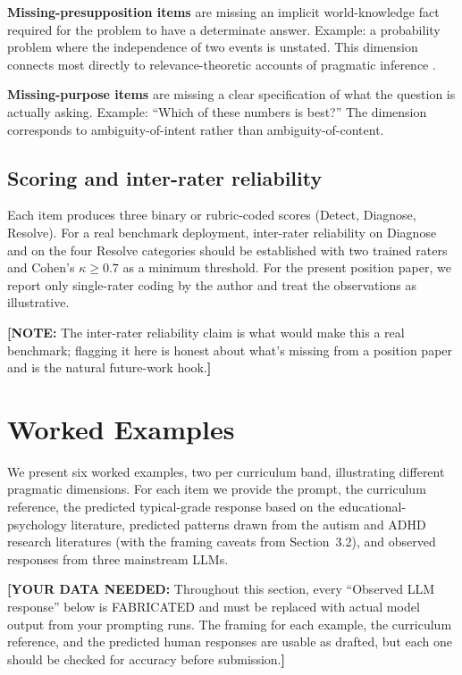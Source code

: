 \documentclass[11pt,letterpaper]{article}
\newcommand{\dataneeded}[1]{{\color{blue}\textbf{[YOUR DATA NEEDED:} #1\textbf{]}}}
\newcommand{\todonote}[1]{{\color{violet}\textbf{[NOTE:} #1\textbf{]}}}
\begin{document}
\textbf{Missing-presupposition items} are missing an implicit world-knowledge fact required for the problem to have a determinate answer. Example: a probability problem where the independence of two events is unstated. This dimension connects most directly to relevance-theoretic accounts of pragmatic inference \citep{sperber1995, loukusa2007}.

\textbf{Missing-purpose items} are missing a clear specification of what the question is actually asking. Example: ``Which of these numbers is best?'' The dimension corresponds to ambiguity-of-intent rather than ambiguity-of-content.

\subsection{Scoring and inter-rater reliability}

Each item produces three binary or rubric-coded scores (Detect, Diagnose, Resolve). For a real benchmark deployment, inter-rater reliability on Diagnose and on the four Resolve categories should be established with two trained raters and Cohen's $\kappa \geq 0.7$ as a minimum threshold. For the present position paper, we report only single-rater coding by the author and treat the observations as illustrative.

\todonote{The inter-rater reliability claim is what would make this a real benchmark; flagging it here is honest about what's missing from a position paper and is the natural future-work hook.}

\section{Worked Examples}
\label{sec:examples}

We present six worked examples, two per curriculum band, illustrating different pragmatic dimensions. For each item we provide the prompt, the curriculum reference, the predicted typical-grade response based on the educational-psychology literature, predicted patterns drawn from the autism and ADHD research literatures (with the framing caveats from Section~3.2), and observed responses from three mainstream LLMs.

\dataneeded{Throughout this section, every ``Observed LLM response'' below is FABRICATED and must be replaced with actual model output from your prompting runs. The framing for each example, the curriculum reference, and the predicted human responses are usable as drafted, but each one should be checked for accuracy before submission.}
\end{document}
